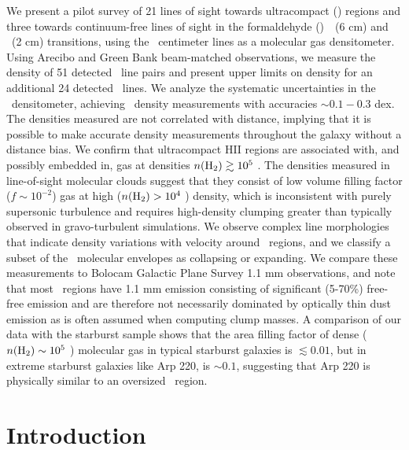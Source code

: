   We present a pilot survey of 21 lines of sight towards ultracompact 
  (\uchii) regions and three towards continuum-free lines of sight in the
  formaldehyde (\formaldehyde)\ \oneone\ (6 cm) and \twotwo\ (2 cm)
  transitions, using the \formaldehyde\ centimeter lines as a molecular gas densitometer.
  Using Arecibo and Green Bank beam-matched observations, we measure the
  density of 51 detected \formaldehyde\ line pairs and present upper limits on
  density for an additional 24 detected \oneone\ lines.  We analyze the
  systematic uncertainties in the \formaldehyde\ densitometer, achieving \hh\ density measurements
  with accuracies $\sim0.1-0.3$ dex.  The densities measured are not correlated with distance,
  implying that it is possible to make accurate density measurements throughout the galaxy without 
  a distance bias.  We confirm that
  ultracompact HII regions are associated with, and possibly embedded in, gas
  at densities $n(\textrm{H}_{2})\gtrsim10^{5}$ \percc.  The densities measured in
  line-of-sight molecular clouds suggest that they consist of low
  volume filling factor ($f\sim10^{-2}$) gas at high ($n(\textrm{H}_{2})>10^4$ \percc) density, which is inconsistent
  with purely supersonic turbulence and requires high-density clumping greater than
  typically observed in gravo-turbulent simulations.  We observe complex line
  morphologies that indicate density variations
  with velocity around \uchii\ regions, and we classify a subset of the \uchii\ molecular envelopes
  as collapsing or expanding.  We compare these measurements to Bolocam Galactic Plane
  Survey 1.1 mm observations, and note
  that most \uchii\ regions have 1.1 mm emission consisting of
  significant (5-70\%) free-free emission and are therefore not necessarily
  dominated by optically thin dust emission as is often assumed when computing
  clump masses.  A comparison of our data with the \citet{Mangum2008}
  starburst sample shows that the area filling factor of dense
  ($n(\textrm{H}_{2})\sim10^5$ \percc) molecular gas in typical starburst galaxies is
  $\lesssim0.01$, but in extreme starburst galaxies like Arp 220, is $\sim0.1$,
  suggesting that Arp 220 is physically similar to an oversized \uchii\ region.

\section{Introduction}

